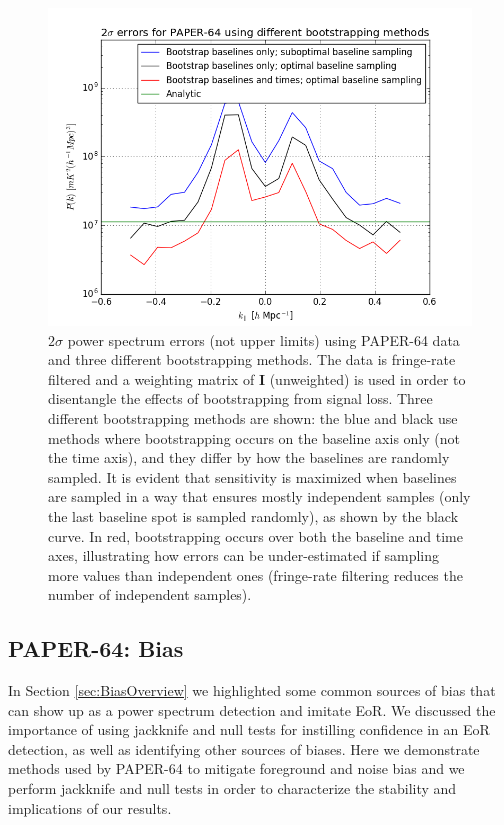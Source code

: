 \documentclass[preprint2,numberedappendix,tighten]{aastex6}  %
\begin{document}
\begin{figure}
	\centering
	\includegraphics[trim={0.3cm 0.3cm 0.3cm 0.3cm},width=\columnwidth]{plots/data_errors.png}
	\caption{$2\sigma$ power spectrum errors (not upper limits) using PAPER-64 data and three different bootstrapping methods. The data is fringe-rate filtered and a weighting matrix of $\textbf{I}$ (unweighted) is used in order to disentangle the effects of bootstrapping from signal loss. Three different bootstrapping methods are shown: the blue and black use methods where bootstrapping occurs on the baseline axis only (not the time axis), and they differ by how the baselines are randomly sampled. It is evident that sensitivity is maximized when baselines are sampled in a way that ensures mostly independent samples (only the last baseline spot is sampled randomly), as shown by the black curve. In red, bootstrapping occurs over both the baseline and time axes, illustrating how errors can be under-estimated if sampling more values than independent ones (fringe-rate filtering reduces the number of independent samples).}
	\label{fig:data_errors}
\end{figure}


\subsection{PAPER-64: Bias}
\label{sec:Bias}

In Section \ref{sec:BiasOverview} we highlighted some common sources of bias that can show up as a power spectrum detection and imitate EoR. We discussed the importance of using jackknife and null tests for instilling confidence in an EoR detection, as well as identifying other sources of biases. Here we demonstrate methods used by PAPER-64 to mitigate foreground and noise bias and we perform jackknife and null tests in order to characterize the stability and implications of our results.
\end{document}
